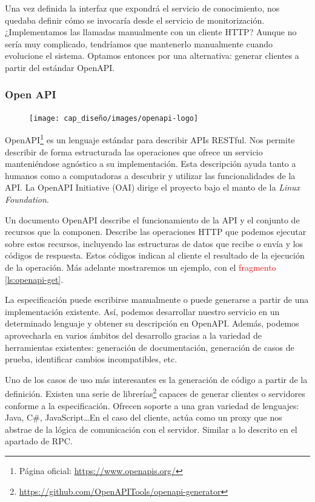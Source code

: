 Una vez definida la interfaz que expondrá el servicio de conocimiento, nos quedaba definir cómo se invocaría desde el servicio de monitorización. ¿Implementamos las llamadas manualmente con un cliente HTTP? Aunque no sería muy complicado, tendríamos que mantenerlo manualmente cuando evolucione el sistema. Optamos entonces por una alternativa: generar clientes a partir del estándar OpenAPI.

\subsubsection{Open API}
\label{chap:OpenAPI}

\begin{figure}
  \vspace{5pt}
  \texttt{[image: cap\_diseño/images/openapi-logo]}
  \centering
  \vspace{5pt}
\end{figure}

OpenAPI\footnote{Página oficial: \url{https://www.openapis.org/}} es un lenguaje estándar para describir APIs RESTful. Nos permite describir de forma estructurada las operaciones que ofrece un servicio manteniéndose agnóstico a su implementación. Esta descripción ayuda tanto a humanos como a computadoras a descubrir y utilizar las funcionalidades de la API. La OpenAPI Initiative (OAI) dirige el proyecto bajo el manto de la \emph{Linux Foundation}.

Un documento OpenAPI describe el funcionamiento de la API y el conjunto de recursos que la componen. Describe las operaciones HTTP que podemos ejecutar sobre estos recursos, incluyendo las estructuras de datos que recibe o envía y los códigos de respuesta. Estos códigos indican al cliente el resultado de la ejecución de la operación. \cite{openapi_initiativeOpenAPISpecificationV3} Más adelante mostraremos un ejemplo, con el \textcolor{red}{fragmento} \ref{ls:openapi-get}.

La especificación puede escribirse manualmente o puede generarse a partir de una implementación existente. Así, podemos desarrollar nuestro servicio en un determinado lenguaje y obtener su descripción en OpenAPI. Además, podemos aprovecharla en varios ámbitos del desarrollo gracias a la variedad de herramientas existentes: generación de documentación, generación de casos de prueba, identificar cambios incompatibles, etc. \cite{westerveldChapterOpenAPIAPI2021}

Uno de los casos de uso más interesantes es la generación de código a partir de la definición. Existen una serie de librerías\footnote{\url{https://github.com/OpenAPITools/openapi-generator}} capaces de generar clientes o servidores conforme a la especificación. Ofrecen soporte a una gran variedad de lenguajes: Java, C\#, JavaScript\dots En el caso del cliente, actúa como un proxy que nos abstrae de la lógica de comunicación con el servidor. Similar a lo descrito en el apartado de RPC.


